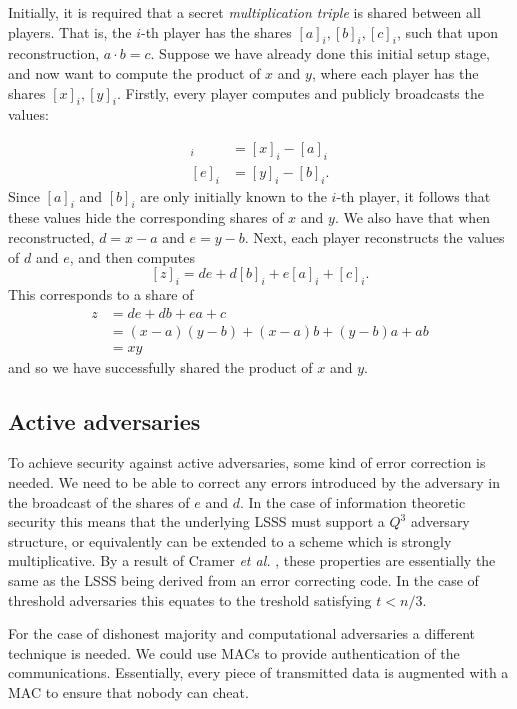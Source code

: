\documentclass[11pt]{article}
\begin{document}
Initially, it is required that a secret \textit{multiplication triple} is
shared between all players. That is, the $i$-th player has the shares $[a]_i,
[b]_i, [c]_i$, such that upon reconstruction, $a \cdot b = c$.
Suppose we have already done this initial setup stage, and now want
to compute the product of $x$ and $y$, where each player
has the shares $[x]_i, [y]_i$. Firstly, every player computes and
publicly broadcasts the values:

\begin{align*}
[d]_i &= [x]_i - [a]_i \\
[e]_i &= [y]_i - [b]_i.
\end{align*}
Since $[a]_i$ and $[b]_i$ are only initially known to the $i$-th player, it
follows that these values hide the corresponding shares of $x$ and $y$. We also
have that when reconstructed, $d = x - a$ and $e = y - b$. Next, each player
reconstructs the values of $d$ and $e$, and then computes
\[[z]_i = de + d[b]_i + e[a]_i + [c]_i.\]
This corresponds to a share of
\begin{align*}
z &= de + db + ea + c \\
  &= (x-a)(y-b) + (x-a)b + (y-b)a + ab \\
  &= xy
\end{align*}
%
and so we have successfully shared the product of $x$ and $y$.


\subsection*{Active adversaries}
To achieve security against active adversaries, some kind of error correction
is needed. 
We need to be able to correct any errors introduced by the adversary in
the broadcast of the shares of $e$ and $d$.
In the case of information theoretic security this means that the
underlying LSSS must support a $Q^3$ adversary structure, or
equivalently can be extended to a scheme which is 
strongly multiplicative.
By a result of Cramer \textit{et al.} \cite{Cramer2000},
these properties are essentially the same as the LSSS being
derived from an error correcting code.
In the case of threshold adversaries this equates to the treshold
satisfying $t<n/3$.

For the case of dishonest majority and computational adversaries
a different technique is needed.
We could use MACs to provide authentication of the communications. 
Essentially, every piece
of transmitted data is augmented with a MAC to ensure that nobody can cheat.
\end{document}
